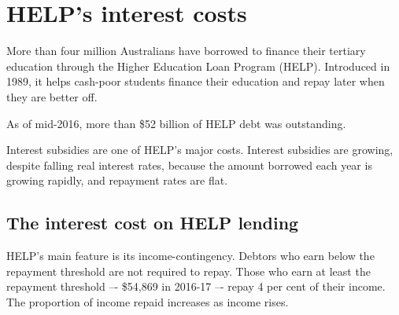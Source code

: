 \documentclass[embargoed]{grattan}
\begin{document}


\chapter[HELP's interest costs]{\gls{HELP}'s interest costs}\label{chap:2-helps-interest-costs}

More than four million Australians have borrowed to finance their tertiary education through the Higher Education Loan Program (\gls{HELP}).
Introduced in 1989, it helps cash-poor students finance their education and repay later when they are better off. 

As of mid-2016, more than \$52 billion of HELP debt was outstanding. 

Interest subsidies are one of \gls{HELP}'s major costs.
Interest subsidies are growing, despite falling real interest rates, because the amount borrowed each year is growing rapidly, and repayment rates are flat.

\section[The interest cost on \gls{HELP} lending]{The interest cost on \gls{HELP} lending}\label{sec:cpi-versus-the-governments-cost-of-borrowing}

\gls{HELP}’s main feature is its income-contingency.
Debtors who earn below the repayment threshold are not required to repay. 
Those who earn at least the repayment threshold –- \$54,869 in 2016-17 –- repay 4 per cent of their income. 
The proportion of income repaid increases as income rises. 
\end{document}
